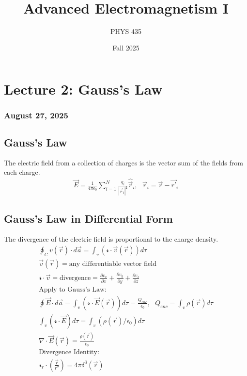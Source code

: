 \documentclass{article}
\title{Advanced Electromagnetism I}
\author{PHYS 435}
\date{Fall 2025}
\begin{document}
\maketitle

\newpage
\tableofcontents
\newpage

\section{Lecture 2: Gauss's Law}
\subsubsection*{August 27, 2025}

\subsection{Gauss's Law}
\begin{conceptbox}
The electric field from a collection of charges is the vector sum of the fields from each charge.
\begin{align*}
    \vec{E} = \frac{1}{4\pi\epsilon_0}\sum_{i=1}^N \frac{q_i}{|\vec{r}_i|^2} \hat{\vec{r}}_i,\text{ } \vec{r}_i=\vec{r}-\vec{r'}_i
\end{align*}
\end{conceptbox}

\subsection{Gauss's Law in Differential Form}
\begin{conceptbox}
The divergence of the electric field is proportional to the charge density.
\begin{align*}
    \oint_C v(\vec{r}) \cdot d\vec{a} = \int_v (\mathcal{r}\cdot\vec{v}(\vec{r}))d\tau \\
    \vec{v}(\vec{r}) = \text{any differentiable vector field} \\
    \mathcal{r}\cdot\vec{v} = \text{divergence} = \frac{\partial v_x}{\partial x} + \frac{\partial v_y}{\partial y} + \frac{\partial v_z}{\partial z} \\
    \text{Apply to Gauss's Law}: \\
    \oint \vec{E} \cdot d\vec{a} = \int_v (\mathcal{r}\cdot\vec{E}(\vec{r}))d\tau = \frac{Q_{enc}}{\epsilon_0}, \text{ } Q_{enc} = \int_v \rho(\vec{r})d\tau \\
    \int_v(\mathcal{r}\cdot\vec{E})d\tau = \int_v(\rho(\vec{r})/\epsilon_0)d\tau \\
    \nabla\cdot\vec{E}(\vec{r}) = \frac{\rho(\vec{r})}{\epsilon_0} \\
    \text{Divergence Identity: }\\
    \mathcal{r}_r\cdot(\frac{\vec{r}}{r^2}) = 4\pi\delta^3(\vec{r}) \\
\end{align*}
\end{conceptbox}
\end{document}
